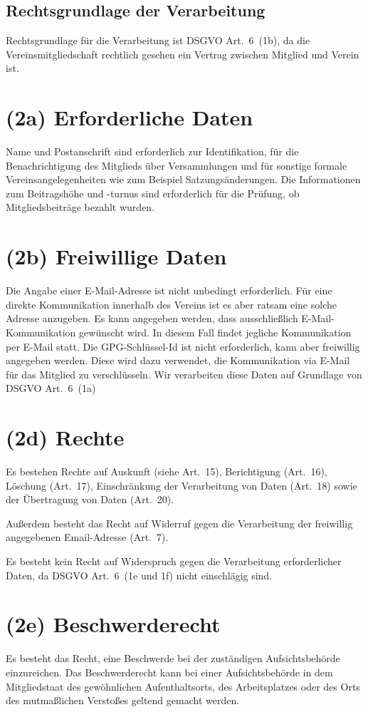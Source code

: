 \documentclass{article}
\begin{document}
\subsection*{Rechtsgrundlage der Verarbeitung}

Rechtsgrundlage für die Verarbeitung ist DSGVO Art.~6~(1b), da die
Vereinsmitgliedschaft rechtlich gesehen ein Vertrag zwischen Mitglied
und Verein ist.

\section*{(2a) Erforderliche Daten}

Name und Postanschrift sind erforderlich zur Identifikation, für die
Benachrichtigung des Mitglieds über Versammlungen und für sonstige
formale Vereinsangelegenheiten wie zum Beispiel Satzungsänderungen.
%
Die Informationen zum Beitragshöhe und -turnus sind erforderlich
für die Prüfung, ob Mitgliedsbeiträge bezahlt wurden.


\section*{(2b) Freiwillige Daten}

Die Angabe einer E-Mail-Adresse ist nicht unbedingt erforderlich.
Für eine direkte Kommunikation innerhalb des Vereins ist es aber ratsam eine solche Adresse anzugeben.
Es kann angegeben werden, dass ausschließlich E-Mail-Kommunikation gewünscht wird.
In diesem Fall findet jegliche Kommunikation per E-Mail statt.
%
Die GPG-Schlüssel-Id ist nicht erforderlich, kann aber freiwillig angegeben werden.
Diese wird dazu verwendet, die Kommunikation via E-Mail für das Mitglied zu verschlüsseln.
%
Wir verarbeiten diese Daten auf Grundlage von DSGVO Art.~6~(1a)


\section*{(2d) Rechte}

Es bestehen Rechte auf Auskunft (siehe Art.~15),
Berichtigung (Art.~16),
Löschung (Art.~17),
Einschränkung der Verarbeitung von Daten (Art.~18)
sowie der Übertragung von Daten (Art.~20).

Außerdem besteht das Recht auf Widerruf gegen die Verarbeitung der freiwillig angegebenen Email-Adresse (Art.~7).

Es besteht kein Recht auf Widerspruch gegen die Verarbeitung erforderlicher Daten,
da DSGVO Art.~6~(1e und 1f) nicht einschlägig sind.

\section*{(2e) Beschwerderecht}

Es besteht das Recht, eine Beschwerde bei der zuständigen Aufsichtsbehörde einzureichen.
Das Beschwerderecht kann bei einer Aufsichtsbehörde in dem Mitgliedstaat
des gewöhnlichen Aufenthaltsorts,
des Arbeitsplatzes oder
des Orts des mutmaßlichen Verstoßes geltend gemacht werden.
\end{document}
